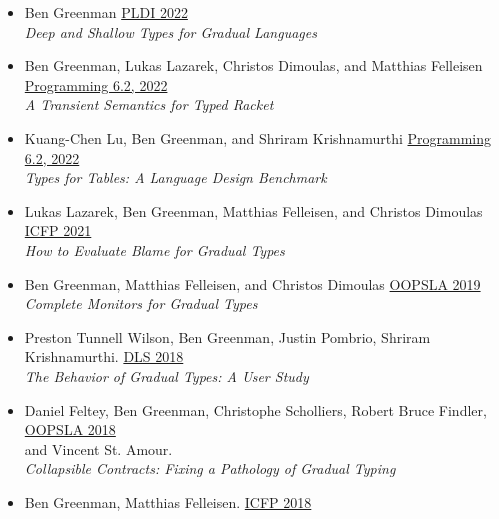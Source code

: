 \documentclass[11pt]{article}
\begin{document}
\begin{itemize}
\item
  Ben Greenman \hfill \href{https://pldi22.sigplan.org/}{PLDI 2022} \\
    \emph{Deep and Shallow Types for Gradual Languages} \hfill {}
\item
  Ben Greenman, Lukas Lazarek, Christos Dimoulas, and Matthias Felleisen \hfill \href{https://2022.programming-conference.org/}{Programming 6.2, 2022} \\
    \emph{A Transient Semantics for Typed Racket} \hfill {} %
\item
  Kuang-Chen Lu, Ben Greenman, and Shriram Krishnamurthi \hfill \href{https://2022.programming-conference.org/}{Programming 6.2, 2022} \\
    \emph{Types for Tables: A Language Design Benchmark} \hfill {}
\item
  Lukas Lazarek, Ben Greenman, Matthias Felleisen, and Christos Dimoulas \hfill \href{https://icfp21.sigplan.org/}{ICFP 2021} \\
  \emph{How to Evaluate Blame for Gradual Types} \hfill {} %
\item
  Ben Greenman, Matthias Felleisen, and Christos Dimoulas \hfill \href{https://conf.researchr.org/track/splash-2019/splash-2019-OOPSLA}{OOPSLA 2019} \\
  \emph{Complete Monitors for Gradual Types} \hfill {}
\item
  Preston Tunnell Wilson, Ben Greenman, Justin Pombrio, Shriram Krishnamurthi. \hfill \href{https://conf.researchr.org/track/dls-2018/dls-2018}{DLS 2018} \\
  \emph{The Behavior of Gradual Types: A User Study} \hfill {}
\item
  Daniel Feltey, Ben Greenman, Christophe Scholliers, Robert Bruce Findler, \hfill \href{https://2018.splashcon.org/track/splash-2018-OOPSLA}{OOPSLA 2018} \\
  and Vincent St. Amour. \\
  \emph{Collapsible Contracts: Fixing a Pathology of Gradual Typing} \hfill {}
\item
  Ben Greenman, Matthias Felleisen. \hfill \href{https://icfp18.sigplan.org/}{ICFP 2018} \\

\end{itemize}
\end{document}
